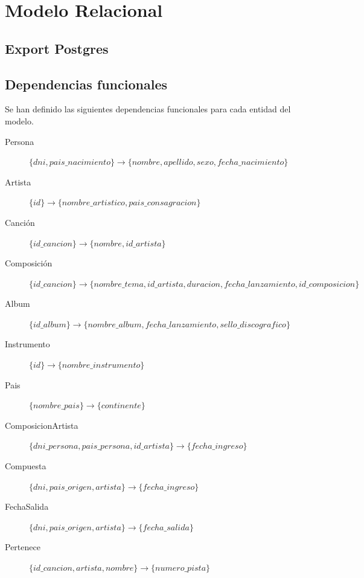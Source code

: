 \documentclass[10pt,a4paper]{article}
\begin{document}
\section{Modelo Relacional}

\subsection{Export Postgres}
%

\subsection{Dependencias funcionales}
Se han definido las siguientes dependencias funcionales para cada entidad del modelo.
\begin{description}

	\item [Persona]
	$	\{ dni, pais\_nacimiento \} \rightarrow \{ nombre, apellido, sexo, fecha\_nacimiento \} $

	\item [Artista]
	$	\{ id \} \rightarrow \{ nombre\_artistico, pais\_consagracion \} $

	\item [Canción]
		$\{ id\_cancion \} \rightarrow \{ nombre, id\_artista \}$

	\item [Composición]
	$\{ id\_cancion \} \rightarrow \{ nombre\_tema, id\_artista, duracion, fecha\_lanzamiento, id\_composicion \}$

	\item [Album]
	$\{ id\_album \} \rightarrow \{ nombre\_album, fecha\_lanzamiento, sello\_discografico \}$

	\item [Instrumento]
	$\{ id\} \rightarrow \{nombre\_instrumento\} $

	\item [Pais]
	$ \{nombre\_pais\} \rightarrow \{continente\} $

	\item [ComposicionArtista]
	$ \{dni\_persona, pais\_persona, id\_artista \} \rightarrow \{ fecha\_ingreso \} $

	\item [Compuesta]
	$ \{dni, pais\_origen, artista \} \rightarrow \{ fecha\_ingreso \} $

	\item [FechaSalida]
	$ \{dni, pais\_origen, artista \} \rightarrow \{ fecha\_salida \} $

	\item [Pertenece]
	$ \{id\_cancion, artista, nombre \} \rightarrow \{ numero\_pista \} $
		
\end{description}
\end{document}
